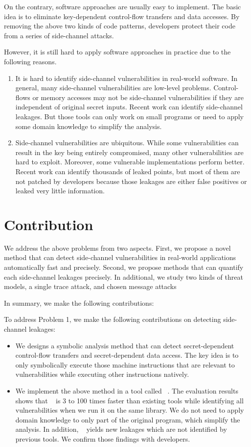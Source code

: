 On the contrary, software approaches are
usually easy to implement. The basic idea is to eliminate key-dependent
control-flow transfers and data accesses. By removing the above two kinds of code patterns, developers protect their 
code from a series of side-channel attacks.


However, it is still hard to apply software approaches in practice due to the following reasons.

\begin{enumerate}
    \item It is hard to identify side-channel vulnerabilities in real-world software. In general, many side-channel vulnerabilities are low-level problems. Control-flows or memory accesses may not be side-channel vulnerabilities if they are independent of original secret inputs. Recent work can identify side-channel leakages. But those tools can only work on small programs or need to apply some domain knowledge to simplify the analysis. 
    \item Side-channel vulnerabilities are ubiquitous. While some vulnerabilities can result in the key being entirely compromised, many other vulnerabilities are hard to exploit. Moreover, some vulnerable implementations perform better. Recent work can identify thousands of leaked points, but most of them are not patched by developers because those leakages are either false positives or leaked very little information.  
\end{enumerate}


\section{Contribution}
We address the above problems from two aspects. First, we propose a novel method that can detect side-channel vulnerabilities in real-world applications automatically fast and precisely. Second, we propose methods that can quantify each side-channel leakages precisely. In additional, we study two kinds of threat models, a single trace attack, and chosen message attacks

In summary, we make the following contributions:

To address Problem 1, we make the following contributions on detecting side-channel leakages:

\begin{itemize}
    \item We designs a symbolic analysis method that can detect secret-dependent control-flow transfers and secret-dependent data access. The key idea is to only symbolically execute those machine instructions that are relevant to vulnerabilities while executing other instructions natively.
    \item We implement the above method in a tool called ~\detect{}. The evaluation results shows that ~\detect{}  is 3 to 100 times faster than existing tools while identifying all vulnerabilities when we run it on the same library.  We do not need to apply domain knowledge to only part of the original program, which simplify the analysis. In addition, ~\detect{} yields new leakages which are not identified by previous tools. We confirm those findings with developers.
\end{itemize}

